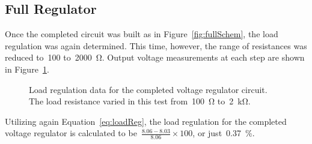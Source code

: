 \subsection{Full Regulator}
Once the completed circuit was built as in Figure~\ref{fig:fullSchem}, the load
regulation was again determined.  This time, however, the range of resistances
was reduced to~100 to~\SI{2000}{\ohm}.  Output voltage measurements at each step are shown in Figure~\ref{fig:fullLoadReg}.
%
\begin{figure}[H]
	\centering
	
	\parbox{4.25in}{
	\caption[Plot --- Load regulation of combined circuit]{Load regulation data
	for the completed voltage regulator circuit.  The load resistance varied in
	this test from~\SI{100}{\ohm} to~\SI{2}{\kilo\ohm}.}
	\label{fig:fullLoadReg}
	}
\end{figure}
%
Utilizing again Equation~\eqref{eq:loadReg}, the load regulation for the
completed voltage regulator is calculated to be~$\frac{8.06-8.03}{8.06} \times
100$, or just~\SI{0.37}{\percent}.

